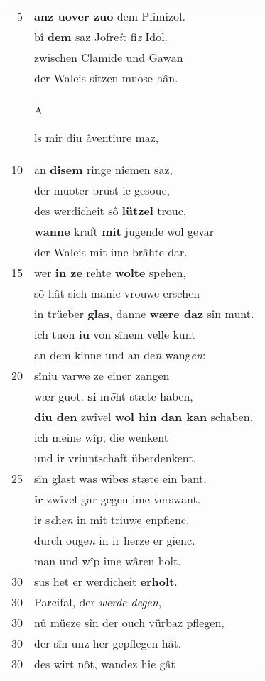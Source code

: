 \documentclass[8pt,a4paper,notitlepage]{article}
\begin{document}
\begin{table}[ht]
\begin{minipage}[t]{0.5\linewidth}
\begin{tabular}{rl}
5 & \textbf{anz uover zuo} dem Plimizol.\\ 
 & bî \textbf{dem} saz Jofre\textit{i}t fi\textit{z} Idol.\\ 
 & zwischen Clamide und Gawan\\ 
 & der Waleis sitzen muose hân.\\ 
 & \begin{large}A\end{large}ls mir diu âventiure maz,\\ 
10 & an \textbf{disem} ringe niemen saz,\\ 
 & der muoter brust ie gesouc,\\ 
 & des werdicheit sô \textbf{lützel} trouc,\\ 
 & \textbf{wanne} kraft \textbf{mit} jugende wol gevar\\ 
 & der Waleis mit ime brâhte dar.\\ 
15 & wer \textbf{in ze} rehte \textbf{wolte} spehen,\\ 
 & sô hât sich manic vrouwe ersehen\\ 
 & in trüeber \textbf{glas}, danne \textbf{wære daz} sîn munt.\\ 
 & ich tuon \textbf{iu} von sînem velle kunt\\ 
 & an dem kinne und an de\textit{n} wang\textit{en}:\\ 
20 & sîniu varwe ze einer zangen\\ 
 & wær guot. \textbf{si} m\textit{ö}ht stæte haben,\\ 
 & \textbf{diu den} zwîvel \textbf{wol hin dan kan} schaben.\\ 
 & ich meine wîp, die wenkent\\ 
 & und ir vriuntschaft überdenkent.\\ 
25 & sîn glast was wîbes stæte ein bant.\\ 
 & \textbf{ir} zwîvel gar gegen ime verswant.\\ 
 & ir s\textit{e}he\textit{n} in mit triuwe enpfienc.\\ 
 & durch ouge\textit{n} in ir herze er gienc.\\ 
 & man und wîp ime wâren holt.\\ 
30 & sus het er werdicheit \textbf{erholt}.\\ 
30 & Parcifal, der \textit{werde degen},\\ 
30 & nû müeze sîn der ouch vürbaz pflegen,\\ 
30 & der sîn unz her gepflegen hât.\\ 
30 & des wirt nôt, wandez hie gât\\ 

\end{tabular}
\end{minipage}
\end{table}
\end{document}
